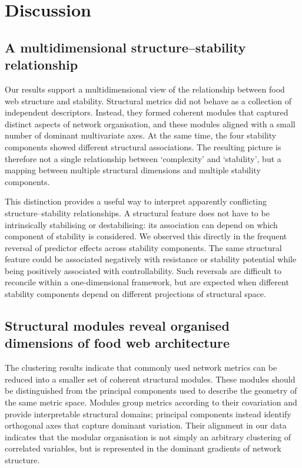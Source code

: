 \documentclass[
]{article}
\begin{document}
\section{Discussion}\label{discussion}

\subsection{A multidimensional structure--stability
relationship}\label{a-multidimensional-structurestability-relationship}

Our results support a multidimensional view of the relationship between
food web structure and stability. Structural metrics did not behave as a
collection of independent descriptors. Instead, they formed coherent
modules that captured distinct aspects of network organisation, and
these modules aligned with a small number of dominant multivariate axes.
At the same time, the four stability components showed different
structural associations. The resulting picture is therefore not a single
relationship between `complexity' and `stability', but a mapping between
multiple structural dimensions and multiple stability components.

This distinction provides a useful way to interpret apparently
conflicting structure--stability relationships. A structural feature
does not have to be intrinsically stabilising or destabilising: its
association can depend on which component of stability is considered. We
observed this directly in the frequent reversal of predictor effects
across stability components. The same structural feature could be
associated negatively with resistance or stability potential while being
positively associated with controllability. Such reversals are difficult
to reconcile within a one-dimensional framework, but are expected when
different stability components depend on different projections of
structural space.

\subsection{Structural modules reveal organised dimensions of food web
architecture}\label{structural-modules-reveal-organised-dimensions-of-food-web-architecture}

The clustering results indicate that commonly used network metrics can
be reduced into a smaller set of coherent structural modules. These
modules should be distinguished from the principal components used to
describe the geometry of the same metric space. Modules group metrics
according to their covariation and provide interpretable structural
domains; principal components instead identify orthogonal axes that
capture dominant variation. Their alignment in our data indicates that
the modular organisation is not simply an arbitrary clustering of
correlated variables, but is represented in the dominant gradients of
network structure.
\end{document}
